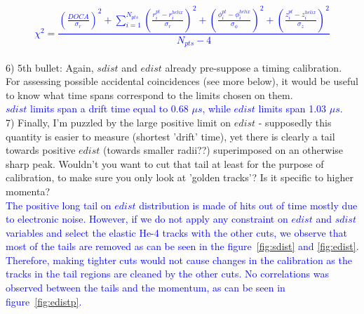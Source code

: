 \textcolor{blue}{
\begin{equation}
   \chi^{2} = \frac{\displaystyle \left(\frac{DOCA}{\sigma_r}\right)^2 
       + \sum_{i = 1}^{ N_{pts}} \left(\frac{r^{pt}_{i} 
      - r^{helix}_{i} }{\sigma_{r}}\right)^{2}  + \left( \frac{\phi^{pt}_{i} - 
      \phi^{helix}_{i} }{\sigma_{\phi}}\right)^{2} + \left( \frac{z^{pt}_{i} - 
   z^{helix}_{i} }{\sigma_{z} } \right)^{2}}{N_{pts} - 4}
\end{equation}
}\\



6) 5th bullet: Again, $sdist$ and $edist$ already pre-suppose a timing 
calibration.  For assessing possible accidental coincidences (see more below), 
it would be useful to know what time spans correspond to the limits chosen on 
them.\\
\textcolor{blue}{ $sdist$ limits span a drift time equal to 0.68 $\mu s$, while 
$edist$ limits span 1.03 $\mu s$.}\\

7) Finally, I'm puzzled by the large positive limit on $edist$ - supposedly this 
quantity is easier to measure (shortest 'drift' time), yet there is clearly a 
tail towards positive $edist$ (towards smaller radii??) superimposed on an 
otherwise sharp peak. Wouldn't you want to cut that tail at least for the 
purpose of calibration, to make sure you only look at 'golden tracks'? Is it 
specific to higher momenta? \\
 \textcolor{blue}{
The positive long tail on $edist$ distribution is made of hits out of time 
mostly due to electronic noise. However, if we do not apply any constraint on 
$edist$ and $sdist$ variables and select the elastic He-4 tracks with the other 
cuts, we observe that most of the tails are removed as can be seen in the 
figure~\ref{fig:sdist} and \ref{fig:edist}. Therefore, making tighter cuts 
would not cause changes in the calibration as the tracks in the tail regions 
are cleaned by the other cuts.  No correlations was observed between the tails 
and the momentum, as can be seen in figure~\ref{fig:edistp}.}\\

